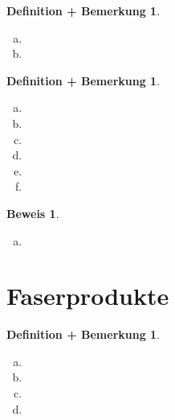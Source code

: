 \documentclass[a4paper, 12pt, numbers=noendperiod, chapterprefix=true]{scrbook}
\theoremstyle{break}
\newtheorem{DefBem}[Def]{Definition + Bemerkung}
\theoremstyle{nonumberbreak}
\newtheorem{bew}{Beweis}
\theoremstyle{nonumberplain}
\begin{document}
\begin{DefBem}\begin{enumerate}[a)]
\item
	
\item
	
\end{enumerate}\end{DefBem}

\begin{DefBem}\begin{enumerate}[a)]
\item
	
\item
	
\item
	
\item
	
\item
	
\item
	
\end{enumerate}\end{DefBem}

\begin{bew}\begin{enumerate}[a)]\item[e)]

\end{enumerate}\end{bew}

\newpage


\section{Faserprodukte}

\begin{DefBem}
\begin{enumerate}[a)]
\item
	
\item
	
\item
	
\item
	
\end{enumerate}\end{DefBem}
\end{document}
